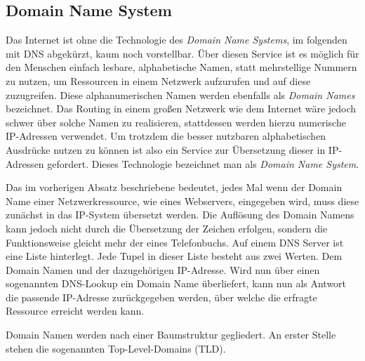 \hypertarget{domain-name-system}{%
\subsection{Domain Name System}\label{domain-name-system}}

Das Internet ist ohne die Technologie des \emph{Domain Name Systems}, im
folgenden mit DNS abgekürzt, kaum noch vorstellbar. Über diesen Service
ist es möglich für den Menschen einfach lesbare, alphabetische Namen,
statt mehrstellige Nummern zu nutzen, um Ressourcen in einem Netzwerk
aufzurufen und auf diese zuzugreifen. Diese alphanumerischen Namen
werden ebenfalls als \emph{Domain Names} bezeichnet. Das Routing in
einem großen Netzwerk wie dem Internet wäre jedoch schwer über solche
Namen zu realisieren, stattdessen werden hierzu numerische IP-Adressen
verwendet. Um trotzdem die besser nutzbaren alphabetischen Ausdrücke
nutzen zu können ist also ein Service zur Übersetzung dieser in
IP-Adressen gefordert. Dieses Technologie bezeichnet man als
\emph{Domain Name System}.

Das im vorherigen Absatz beschriebene bedeutet, jedes Mal wenn der
Domain Name einer Netzwerkressource, wie eines Webservers, eingegeben
wird, muss diese zunächst in das IP-System übersetzt werden. Die
Auflösung des Domain Namens kann jedoch nicht durch die Übersetzung der
Zeichen erfolgen, sondern die Funktionsweise gleicht mehr der eines
Telefonbuchs. Auf einem DNS Server ist eine Liste hinterlegt. Jede Tupel
in dieser Liste besteht aus zwei Werten. Dem Domain Namen und der
dazugehörigen IP-Adresse. Wird nun über einen sogenannten DNS-Lookup ein
Domain Name überliefert, kann nun als Antwort die passende IP-Adresse
zurückgegeben werden, über welche die erfragte Ressource erreicht werden
kann.

Domain Namen werden nach einer Baumstruktur gegliedert. An erster Stelle stehen die sogenannten Top-Level-Domains (TLD).
